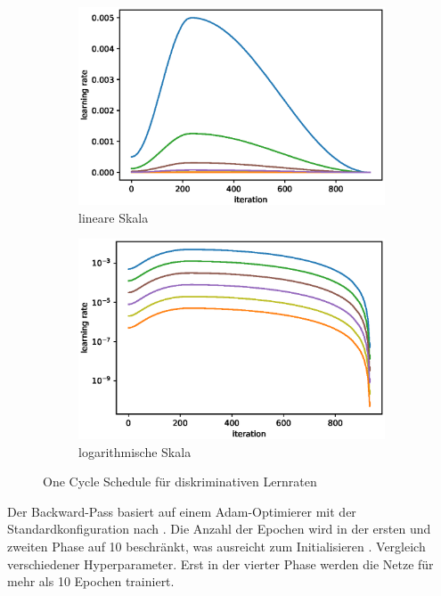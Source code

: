 \begin{figure}
    \centering
    \begin{subfigure}{.5\textwidth}
        \centering
        \includegraphics[width=.9\linewidth]{img/06_one_cycle_lin.eps}
        \caption{lineare Skala}
    \end{subfigure}%
    \begin{subfigure}{.5\textwidth}
        \centering
        \includegraphics[width=.9\linewidth]{img/06_one_cycle_log.eps}
        \caption{logarithmische Skala}
    \end{subfigure}
    \caption{One Cycle Schedule für diskriminativen Lernraten}
    \label{fig:one-cylce}
\end{figure}

Der Backward-Pass basiert auf einem Adam-Optimierer \cite{Kingma14} mit der Standardkonfiguration nach \cite{Gugger20}.
Die Anzahl der Epochen wird in der ersten und zweiten Phase auf 10 beschränkt, was ausreicht zum Initialisieren \bzw. Vergleich verschiedener Hyperparameter.
Erst in der vierter Phase werden die Netze für mehr als 10 Epochen trainiert.

